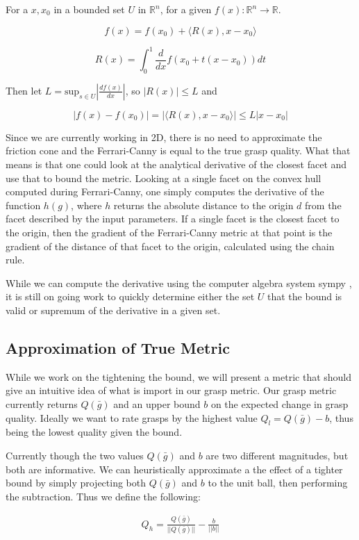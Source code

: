 \documentclass[letterpaper, 10 pt, conference]{ieeeconf}  %
\begin{document}
For a $x,x_0$ in a bounded set $U$ in $\mathbb{R}^n$, for a given $f(x):\mathbb{R}^n \rightarrow \mathbb{R}$. 

\[
  f(x) = f(x_0) + \langle R(x),x-x_0 \rangle
\]

\[
  R(x) = \int_0^1 \frac{d}{dx}f(x_0+t(x-x_0)) dt
\]

Then let $L = \mbox{sup}_{s \in U} |\frac{df(x)}{dx} |$, so $|R(x)| \leq L$ and 

\[
  |f(x)-f(x_0)| = |\langle R(x),x-x_0 \rangle| \leq L |x-x_0|
\]


Since we are currently working in 2D, there is no need to approximate the friction cone and the Ferrari-Canny is equal to the true grasp quality. What that means is that one could look at the analytical derivative of the closest facet and use that to bound the metric. Looking at a single facet on the convex hull computed during Ferrari-Canny, one simply computes the derivative of the function $h(g)$, where $h$ returns the absolute distance to the origin $d$ from the facet described by
the input parameters. If a single facet is the closest facet to the origin, then the gradient of the Ferrari-Canny metric at that point is the gradient of the distance of that facet to the origin, calculated using the chain rule.

While we can compute the derivative using the computer algebra system sympy \cite{SymPy}, it is still on going work to quickly determine either the set $U$ that the bound is valid or supremum of the derivative in a given set.    

\subsection{Approximation of True Metric}
While we work on the tightening the bound, we will present a metric that should give an intuitive idea of what is import in our grasp metric. Our grasp metric currently returns $Q(\bar{g})$ and an upper bound $b$ on the expected change in grasp quality. Ideally we want to rate grasps by the highest value $Q_l = Q(\bar{g}) - b$, thus being the lowest quality given the bound. 

Currently though the two values $Q(\bar{g})$ and $b$ are two different magnitudes, but both are informative. We can heuristically approximate a the effect of a tighter bound by simply projecting both $Q(\bar{g})$ and $b$ to the unit ball, then performing the subtraction. Thus we define the following: 

\begin{align*}
Q_h = \frac{Q(\bar{g})}{||Q(\bar{g})||} - \frac{b}{||b||}
\end{align*}
\end{document}
